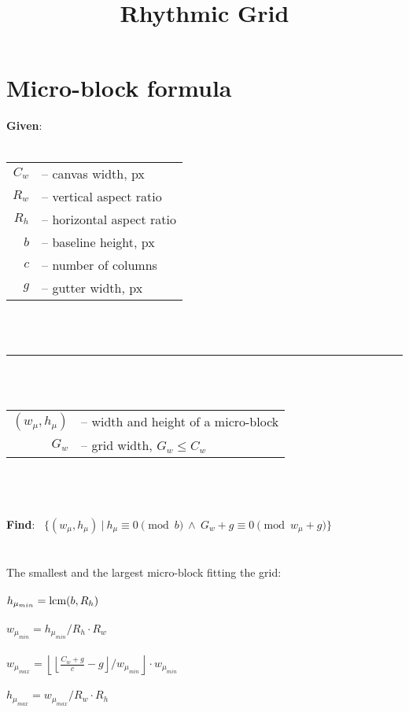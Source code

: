 \documentclass[12pt]{article}
\title{Rhythmic Grid}
\date{}
\begin{document}
\maketitle

\section*{Micro-block formula}
\textbf{Given}: \\ \\
\begin{tabular}{r l}
$C_w$ & -- canvas width, px \\ 
$R_w$ & -- vertical aspect ratio \\
$R_h$ & -- horizontal aspect ratio \\
$b$ & -- baseline height, px \\ 
$c$ & -- number of columns \\
$g$ & -- gutter width, px \\
\end{tabular} \\ \\
\noindent\rule{15cm}{0.4pt} \\ \\
\begin{tabular}{r l}
$(w_\mu, h_\mu)$ & -- width and height of a micro-block \\
$G_w$ & -- grid width, $G_w \leq C_w$ \\
\end{tabular} \\ \\ \\
\textbf{Find}: \ $\{\left( w_{\mu}, h_{\mu} \right) \ | \ h_\mu \equiv 0\pmod{b}  \ \land \  G_w+g \equiv 0\pmod{w_\mu + g}  \}$  \\ \\
\\
The smallest and the largest micro-block fitting the grid:\\ \\
$h_{\mu_{min}} = \textup{lcm} (b, R_h)$ \\ \\
$w_{\mu_{min}} = h_{\mu_{min}} / R_h \cdot R_w$ \\ \\
$w_{\mu_{max}} = \left \lfloor \left \lfloor \frac{C_w+g}{c} -g \right \rfloor /  w_{\mu_{min}} \right \rfloor \cdot w_{\mu_{min}}$ \\ \\
$h_{\mu_{max}} = w_{\mu_{max}} / R_w \cdot R_h$ \\
\end{document}
